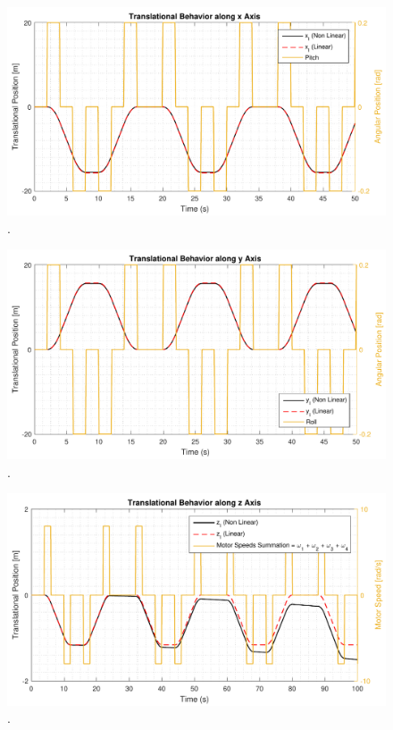 \begin{figure}[H]
	\centering
	\includegraphics[scale=0.55]{figures/xCompModel}
	\caption{.}
	\label{fig:xCompModel}
\end{figure}

\begin{figure}[H]
	\centering
	\includegraphics[scale=0.55]{figures/yCompModel}
	\caption{.}
	\label{fig:yCompModel}
\end{figure}

\begin{figure}[H]
	\centering
	\includegraphics[scale=0.55]{figures/zCompModel}
	\caption{.}
	\label{fig:zCompModel}
\end{figure}
